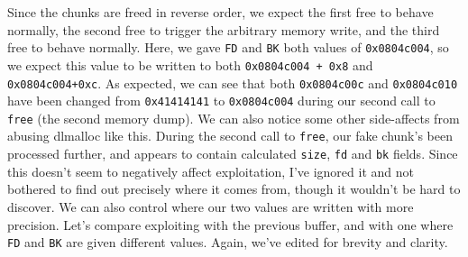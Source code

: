 Since the chunks are freed in reverse order, we expect the first free to
behave normally, the second free to trigger the arbitrary memory write,
and the third free to behave normally.
Here, we gave \texttt{FD} and \texttt{BK} both values of \texttt{0x0804c004},
so we expect this value to be written to both \texttt{0x0804c004 + 0x8} and \texttt{0x0804c004+0xc}.
As expected, we can see that both \texttt{0x0804c00c} and \texttt{0x0804c010} have
been changed from \texttt{0x41414141} to \texttt{0x0804c004} during our second
call to \texttt{free} (the second memory dump). We can also notice some other
side-affects from abusing dlmalloc like this. During the second call to \texttt{free},
our fake chunk's been processed further, and appears to contain calculated
\texttt{size}, \texttt{fd} and \texttt{bk} fields. Since this doesn't seem to negatively
affect exploitation, I've ignored it and not bothered to find out precisely
where it comes from, though it wouldn't be hard to discover.
We can also control where our two values are written with more precision. Let's compare
exploiting with the previous buffer, and with one where \texttt{FD} and \texttt{BK}
are given different values. Again, we've edited for brevity and clarity.

